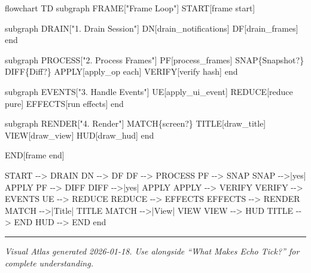 \documentclass[
]{book}
\newenvironment{Shaded}{}{}
\newcommand{\NormalTok}[1]{#1}
\begin{document}
\begin{Shaded}
\begin{Highlighting}[]
\NormalTok{flowchart TD}
\NormalTok{    subgraph FRAME["Frame Loop"]}
\NormalTok{        START[frame start]}

\NormalTok{        subgraph DRAIN["1. Drain Session"]}
\NormalTok{            DN[drain\_notifications]}
\NormalTok{            DF[drain\_frames]}
\NormalTok{        end}

\NormalTok{        subgraph PROCESS["2. Process Frames"]}
\NormalTok{            PF[process\_frames]}
\NormalTok{            SNAP\{Snapshot?\}}
\NormalTok{            DIFF\{Diff?\}}
\NormalTok{            APPLY[apply\_op each]}
\NormalTok{            VERIFY[verify hash]}
\NormalTok{        end}

\NormalTok{        subgraph EVENTS["3. Handle Events"]}
\NormalTok{            UE[apply\_ui\_event]}
\NormalTok{            REDUCE[reduce pure]}
\NormalTok{            EFFECTS[run effects]}
\NormalTok{        end}

\NormalTok{        subgraph RENDER["4. Render"]}
\NormalTok{            MATCH\{screen?\}}
\NormalTok{            TITLE[draw\_title]}
\NormalTok{            VIEW[draw\_view]}
\NormalTok{            HUD[draw\_hud]}
\NormalTok{        end}

\NormalTok{        END[frame end]}

\NormalTok{        START {-}{-}\textgreater{} DRAIN}
\NormalTok{        DN {-}{-}\textgreater{} DF}
\NormalTok{        DF {-}{-}\textgreater{} PROCESS}
\NormalTok{        PF {-}{-}\textgreater{} SNAP}
\NormalTok{        SNAP {-}{-}\textgreater{}|yes| APPLY}
\NormalTok{        PF {-}{-}\textgreater{} DIFF}
\NormalTok{        DIFF {-}{-}\textgreater{}|yes| APPLY}
\NormalTok{        APPLY {-}{-}\textgreater{} VERIFY}
\NormalTok{        VERIFY {-}{-}\textgreater{} EVENTS}
\NormalTok{        UE {-}{-}\textgreater{} REDUCE}
\NormalTok{        REDUCE {-}{-}\textgreater{} EFFECTS}
\NormalTok{        EFFECTS {-}{-}\textgreater{} RENDER}
\NormalTok{        MATCH {-}{-}\textgreater{}|Title| TITLE}
\NormalTok{        MATCH {-}{-}\textgreater{}|View| VIEW}
\NormalTok{        VIEW {-}{-}\textgreater{} HUD}
\NormalTok{        TITLE {-}{-}\textgreater{} END}
\NormalTok{        HUD {-}{-}\textgreater{} END}
\NormalTok{    end}
\end{Highlighting}
\end{Shaded}

\begin{center}\rule{0.5\linewidth}{0.5pt}\end{center}

\emph{Visual Atlas generated 2026-01-18. Use alongside ``What Makes Echo
Tick?'' for complete understanding.}

\backmatter
\end{document}
